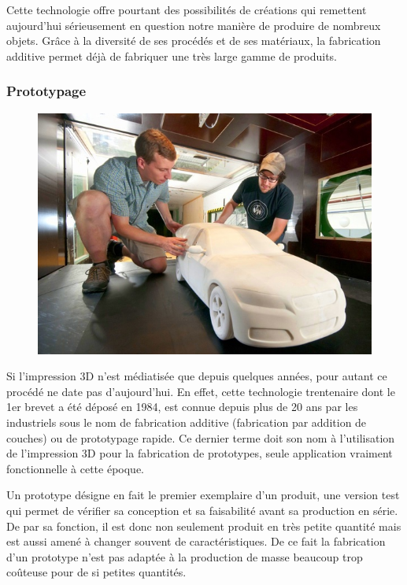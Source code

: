 \documentclass{article}
\begin{document}
Cette technologie offre pourtant des possibilités de créations qui remettent aujourd'hui sérieusement en question notre manière de produire de nombreux objets. Grâce à la diversité de ses procédés et de ses matériaux, la fabrication additive permet déjà de fabriquer une très large gamme de produits.

\subsubsection{Prototypage}
\begin{figure}[h!]
\centering
\includegraphics[scale=0.4]{./images/proto-voiture.png}
\end{figure}\hfill 

Si l'impression 3D n'est médiatisée que depuis quelques années, pour autant ce procédé ne date pas d'aujourd'hui. En effet, cette technologie trentenaire dont le 1er brevet a été déposé en 1984, est connue depuis plus de 20 ans par les industriels sous le nom de fabrication additive (fabrication par addition de couches) ou de prototypage rapide. Ce dernier terme doit son nom à l'utilisation de l'impression 3D pour la fabrication de prototypes, seule application vraiment fonctionnelle à cette époque. \hfill
\par\leavevmode\par
Un prototype désigne en fait le premier exemplaire d'un produit, une version test qui permet de vérifier sa conception et sa faisabilité avant sa production en série. De par sa fonction, il est donc non seulement produit en très petite quantité mais est aussi amené à changer souvent de caractéristiques. De ce fait la fabrication d'un prototype n'est pas adaptée à la production de masse beaucoup trop coûteuse pour de si petites quantités.\hfill
\end{document}
